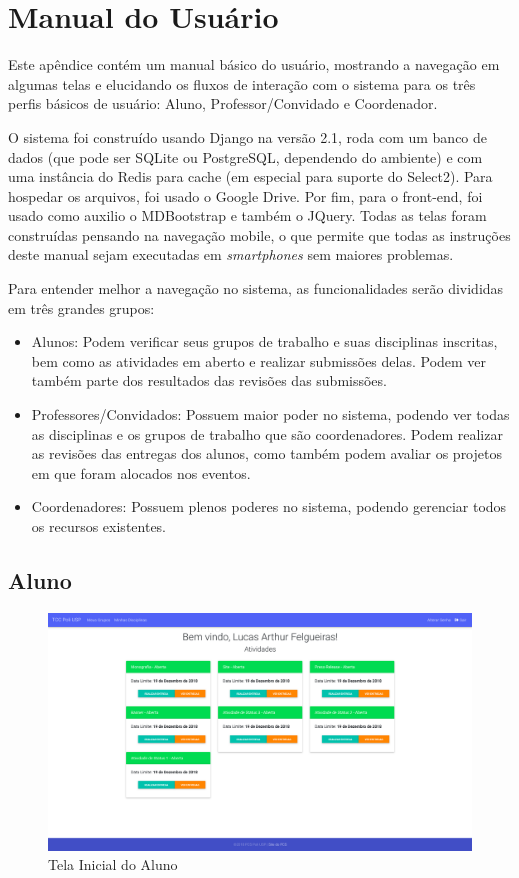 \chapter{Manual do Usuário}\label{chap:user-manual-appendix}
Este apêndice contém um manual básico do usuário, mostrando a navegação em algumas telas e elucidando os fluxos de interação com o sistema para os três perfis básicos de usuário: Aluno, Professor/Convidado e Coordenador.

O sistema foi construído usando Django na versão 2.1, roda com um banco de dados (que pode ser SQLite ou PostgreSQL, dependendo do ambiente) e com uma instância do Redis para cache (em especial para suporte do Select2). Para hospedar os arquivos, foi usado o Google Drive. Por fim, para o front-end, foi usado como auxilio o MDBootstrap e também o JQuery. Todas as telas foram construídas pensando na navegação mobile, o que permite que todas as instruções deste manual sejam executadas em \textit{smartphones} sem maiores problemas.

Para entender melhor a navegação no sistema, as funcionalidades serão divididas em três grandes grupos:

\begin{itemize}
    \item Alunos: Podem verificar seus grupos de trabalho e suas disciplinas inscritas, bem como as atividades em aberto e realizar submissões delas. Podem ver também parte dos resultados das revisões das submissões.
    \item Professores/Convidados: Possuem maior poder no sistema, podendo ver todas as disciplinas e os grupos de trabalho que são coordenadores. Podem realizar as revisões das entregas dos alunos, como também podem avaliar os projetos em que foram alocados nos eventos.
    \item Coordenadores: Possuem plenos poderes no sistema, podendo gerenciar todos os recursos existentes.
\end{itemize}

\section{Aluno}
\begin{figure}[H]
    \centering
    \includegraphics[scale=0.3]{imagens/tela_inicial_aluno.png}
    \caption{Tela Inicial do Aluno}
    \label{fig:initial-screen-student}
\end{figure}

